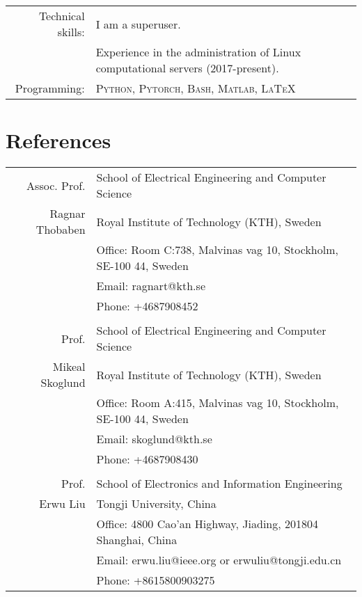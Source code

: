 \documentclass[a4paper,10pt]{article}
\begin{document}
\begin{tabular}{rp{12cm}}
	Technical skills:  & I am a superuser. \\
                     & Experience in the administration of Linux computational servers (2017-present).
                       \vspace{5pt}\\
	Programming:       & \textsc{Python, Pytorch, Bash, Matlab, \LaTeX}  \vspace{5pt}\\
\end{tabular}

\section{References}
\begin{longtable}[H]{r|p{13.5cm}}
  Assoc. Prof. & School of Electrical Engineering and Computer Science\\
  Ragnar Thobaben &Royal Institute of Technology (KTH), Sweden \\
   & Office: Room C:738, Malvinas vag 10, Stockholm, SE-100 44, Sweden \\
               & Email: ragnart@kth.se \\
               & Phone: +4687908452 \\

  \multicolumn{2}{c}{} \\
  Prof.  & School of Electrical Engineering and Computer Science \\
  Mikeal Skoglund &Royal Institute of Technology (KTH), Sweden \\
   & Office: Room A:415, Malvinas vag 10, Stockholm, SE-100 44, Sweden \\
               & Email: skoglund@kth.se \\
               & Phone: +4687908430 \\

  \multicolumn{2}{c}{} \\
  Prof. & School of Electronics and Information Engineering \\
  Erwu Liu &Tongji University, China \\
               & Office: 4800 Cao'an Highway, Jiading, 201804 Shanghai, China\\
                  & Email: erwu.liu@ieee.org or erwuliu@tongji.edu.cn \\
               & Phone: +8615800903275
\end{longtable}
\end{document}
